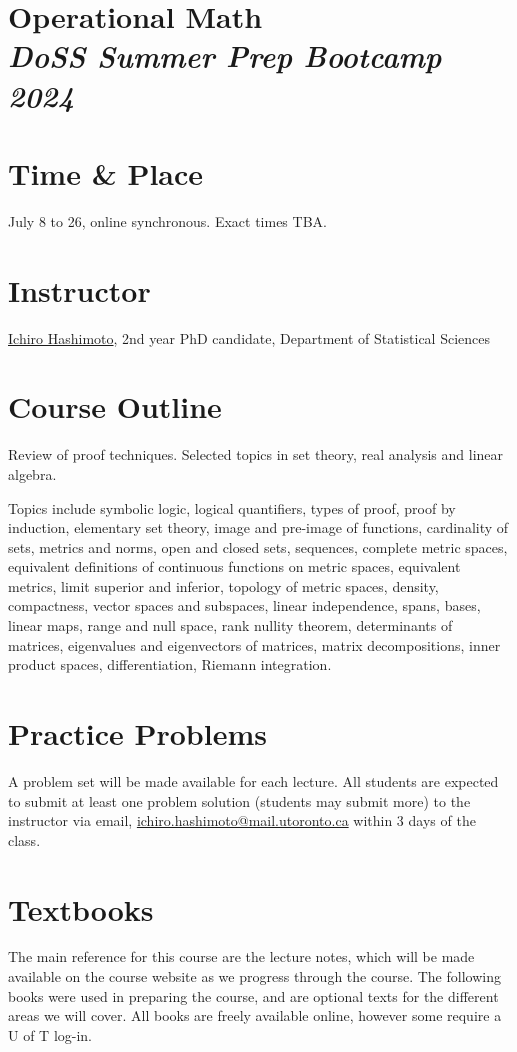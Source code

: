 \documentclass[12pt]{article}
\date{ }
\begin{document}
\section*{Operational Math\\  {\it{DoSS Summer Prep Bootcamp 2024}}}

\section{Time \& Place}
July 8 to 26, online synchronous. Exact times TBA.

\section{Instructor}
\href{mailto:ichiro.hashimoto@mail.utoronto.ca}{Ichiro Hashimoto}, 2nd year PhD candidate, Department of Statistical Sciences


\section{Course Outline}
Review of proof techniques. Selected topics in set theory, real analysis and linear algebra. 

\vspace{1em}

\noindent
Topics include symbolic logic, logical quantifiers, types of proof, proof by induction, elementary set theory, image and pre-image of functions, cardinality of sets, metrics and norms, open and closed sets, sequences, complete metric spaces, equivalent definitions of continuous functions on metric spaces, equivalent metrics, limit superior and inferior, topology of metric spaces, density, compactness, vector spaces and subspaces, linear independence, spans, bases, linear maps, range and null space, rank nullity theorem, determinants of matrices, eigenvalues and eigenvectors of matrices, matrix decompositions, inner product spaces, differentiation, Riemann integration.

\section{Practice Problems}
A problem set will be made available for each lecture. All students are expected to submit at least one problem solution (students may submit more) to the instructor via email, \href{mailto:ichiro.hashimoto@mail.utoronto.ca}{ichiro.hashimoto@mail.utoronto.ca} within 3 days of the class.

\section{Textbooks}
The main reference for this course are the lecture notes, which will be made available on the course website as we progress through the course. The following books were used in preparing the course, and are optional texts for the different areas we will cover. All books are freely available online, however some require a U of T log-in.
\end{document}
